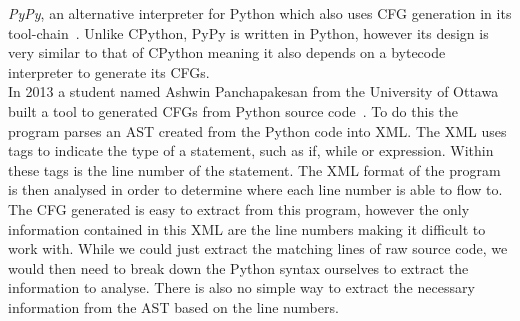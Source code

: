 \documentclass[12pt, titlepage]{article}
\begin{document}
\indent \textit{PyPy}, an alternative interpreter for Python which also uses CFG generation in its tool-chain~\cite{pypyCFG}. Unlike CPython, PyPy is written in Python, however its design is very similar to that of CPython meaning it also depends on a bytecode interpreter to generate its CFGs. \\
\indent In 2013 a student named Ashwin Panchapakesan from the University of Ottawa built a tool to generated CFGs from Python source code~\cite{ashwinCFG}. To do this the program parses an AST created from the Python code into XML. The XML uses tags to indicate the type of a statement, such as if, while or expression. Within these tags is the line number of the statement. The XML format of the program is then analysed in order to determine where each line number is able to flow to. The CFG generated is easy to extract from this program, however the only information contained in this XML are the line numbers making it difficult to work with. While we could just extract the matching lines of raw source code, we would then need to break down the Python syntax ourselves to extract the information to analyse. There is also no simple way to extract the necessary information from the AST based on the line numbers.
\end{document}
